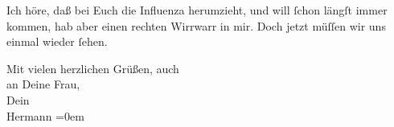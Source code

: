 \pstart
           Ich höre, daß bei Euch die Influenza herumzieht, und will{ }ſchon längſt immer kommen,
               hab aber einen rechten Wirrwarr in mir. Doch jetzt müſſen wir uns einmal wieder{ }ſehen.\pend
           
\pstart
           Mit vielen herzlichen Grüßen, auch{\\[\baselineskip]}an Deine Frau,{\\[\baselineskip]}Dein{\\[\baselineskip]}\spacefill\mbox{Hermann}\pend
           \leftskip=0em{}\endnumbering{}  \newcommand{\dateiname}{L01492}\newcommand{\titel}{Hermann Bahr an Arthur Schnitzler, 21. 1. 1905}\newcommand{\editorInnen}{Herausgegeben von Martin Anton Müller}
